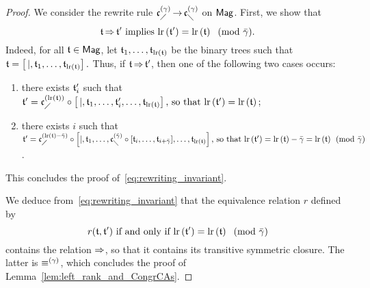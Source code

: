 \begin{proof}
    We consider the rewrite rule $\mathfrak{c}^{\left(\gamma\right)}_{\diagup} \operatorname{\to} \mathfrak{c}^{\left(\gamma\right)}_{\diagdown}$ 
    on $\mathsf{Mag}$. First, we show that 
    \begin{equation} \label{eq:rewriting_invariant}
        \mathfrak{t} \operatorname{\Rightarrow} \mathfrak{t}' 
        \mbox{ implies }
        \mathrm{lr}\left(\mathfrak{t}'\right) = \mathrm{lr}\left(\mathfrak{t}\right) 
        \, \pmod{\bar{\gamma}}.
    \end{equation}
    Indeed, for all $\mathfrak{t} \in \mathsf{Mag}$, let
    $\mathfrak{t}_1, \dots, \mathfrak{t}_{\mathrm{lr}\left(\mathfrak{t}\right)}$ be the binary trees
    such that
    \begin{math}
      \mathfrak{t} = 
      \left[\, |,\mathfrak{t}_1, \dots, \mathfrak{t}_{\mathrm{lr}\left(\mathfrak{t}\right)} \right].
    \end{math}
    Thus, if $\mathfrak{t} \operatorname{\Rightarrow} \mathfrak{t}'$, then one of the following two
    cases occurs:
    \begin{enumerate}[label={(\it\roman*)}]
        \item there exists $\mathfrak{t}_i'$ such that
            \begin{math}
              \mathfrak{t}' = \mathfrak{c}^{\left(\mathrm{lr}\left(\mathfrak{t}\right)\right)}_{\diagup} \circ 
              \left[\, | ,\mathfrak{t}_1, \dots, \mathfrak{t}_i',\dots, 
                    \mathfrak{t}_{\mathrm{lr}\left(\mathfrak{t}\right)}
              \right] \mbox{, so that } 
              \mathrm{lr}\left(\mathfrak{t}'\right) = \mathrm{lr}\left(\mathfrak{t}\right);
            \end{math}
        \item there exists $i$ such that
            \begin{math} 
              \mathfrak{t}' = \mathfrak{c}^{\left(\mathrm{lr}\left(\mathfrak{t}\right)-\bar{\gamma}\right)}_{\diagup} \circ
              \left[ | ,\mathfrak{t}_1, \dots, 
                 \mathfrak{c}^{\left(\bar{\gamma}\right)}_{\diagdown} \circ 
                 [\mathfrak{t}_{i},\dots, \mathfrak{t}_{i+\bar{\gamma}}]
                 ,\dots, \mathfrak{t}_{\mathrm{lr}\left(\mathfrak{t}\right)}
              \right]
              \mbox{, so that }\\
              \mathrm{lr}\left(\mathfrak{t}'\right) = 
              \mathrm{lr}\left(\mathfrak{t}\right) - \bar{\gamma} = 
              \mathrm{lr}\left(\mathfrak{t}\right) \pmod{\bar{\gamma}}
            \end{math}.
    \end{enumerate} 
    This concludes the proof of~\eqref{eq:rewriting_invariant}.  
    \smallbreak
    
    We deduce from~\eqref{eq:rewriting_invariant} that the equivalence 
    relation $r$ defined by 
    \begin{equation}
        r(\mathfrak{t}, \mathfrak{t}') \mbox{ if and only if } 
        \mathrm{lr}\left(\mathfrak{t}'\right) = \mathrm{lr}\left(\mathfrak{t}\right) 
        \, \pmod{\bar{\gamma}}
    \end{equation}
    contains the relation $\operatorname{\Rightarrow}$, so that it contains its
    transitive symmetric closure. The latter is $\operatorname{\equiv}^{(\gamma)}$,
    which concludes the proof of Lemma~\ref{lem:left_rank_and_CongrCAs}.
\end{proof}
\medbreak

